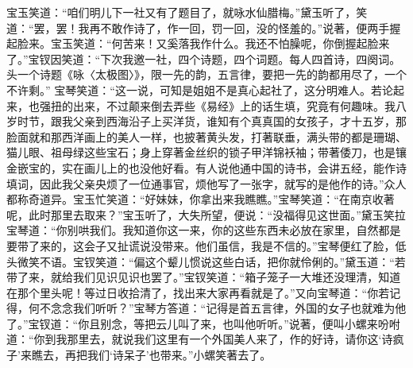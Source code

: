 \begin{parag}


    宝玉笑道：“咱们明儿下一社又有了题目了，就咏水仙腊梅。”黛玉听了，笑道：“罢，罢！我再不敢作诗了，作一回，罚一回，没的怪羞的。”说著，便两手握起脸来。宝玉笑道：“何苦来！又奚落我作什么。我还不怕臊呢，你倒握起脸来了。”宝钗因笑道：“下次我邀一社，四个诗题，四个词题。每人四首诗，四阕词。头一个诗题《咏〈太极图〉》，限一先的韵，五言律，要把一先的韵都用尽了，一个不许剩。” 宝琴笑道：“这一说，可知是姐姐不是真心起社了，这分明难人。若论起来，也强扭的出来，不过颠来倒去弄些《易经》上的话生填，究竟有何趣味。我八岁时节，跟我父亲到西海沿子上买洋货，谁知有个真真国的女孩子，才十五岁，那脸面就和那西洋画上的美人一样，也披著黄头发，打著联垂，满头带的都是珊瑚、猫儿眼、祖母绿这些宝石；身上穿著金丝织的锁子甲洋锦袄袖；带著倭刀，也是镶金嵌宝的，实在画儿上的也没他好看。有人说他通中国的诗书，会讲五经，能作诗填词，因此我父亲央烦了一位通事官，烦他写了一张字，就写的是他作的诗。”众人都称奇道异。宝玉忙笑道：“好妹妹，你拿出来我瞧瞧。”宝琴笑道：“在南京收著呢，此时那里去取来？”宝玉听了，大失所望，便说：“没福得见这世面。”黛玉笑拉宝琴道：“你别哄我们。我知道你这一来，你的这些东西未必放在家里，自然都是要带了来的，这会子又扯谎说没带来。他们虽信，我是不信的。”宝琴便红了脸，低头微笑不语。宝钗笑道：“偏这个颦儿惯说这些白话，把你就伶俐的。”黛玉道：“若带了来，就给我们见识见识也罢了。”宝钗笑道：“箱子笼子一大堆还没理清，知道在那个里头呢！等过日收拾清了，找出来大家再看就是了。”又向宝琴道：“你若记得，何不念念我们听听？”宝琴方答道：“记得是首五言律，外国的女子也就难为他了。”宝钗道：“你且别念，等把云儿叫了来，也叫他听听。”说著，便叫小螺来吩咐道：“你到我那里去，就说我们这里有一个外国美人来了，作的好诗，请你这‘诗疯子’来瞧去，再把我们‘诗呆子’也带来。”小螺笑著去了。
\end{parag}



